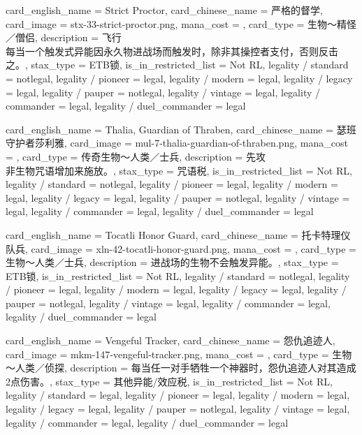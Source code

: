 \documentclass[lang = cn, color = black, 10pt]{AllThatStax}
\begin{document}
\card
{
	card_english_name = {Strict Proctor},
	card_chinese_name = {严格的督学},
	card_image = stx-33-strict-proctor.png,
	mana_cost = ,
	card_type = 生物～精怪／僧侣,
	description = {飞行\\
每当一个触发式异能因永久物进战场而触发时，除非其操控者支付，否则反击之。},
	stax_type = ETB锁,
	is_in_restricted_list = Not RL,
	legality / standard = notlegal,
	legality / pioneer = legal,
	legality / modern = legal,
	legality / legacy = legal,
	legality / pauper = notlegal,
	legality / vintage = legal,
	legality / commander = legal,
	legality / duel_commander = legal
}

\card
{
	card_english_name = {Thalia, Guardian of Thraben},
	card_chinese_name = {瑟班守护者莎利雅},
	card_image = mul-7-thalia-guardian-of-thraben.png,
	mana_cost = ,
	card_type = 传奇生物～人类／士兵,
	description = {先攻\\
非生物咒语增加来施放。},
	stax_type = 咒语税,
	is_in_restricted_list = Not RL,
	legality / standard = notlegal,
	legality / pioneer = legal,
	legality / modern = legal,
	legality / legacy = legal,
	legality / pauper = notlegal,
	legality / vintage = legal,
	legality / commander = legal,
	legality / duel_commander = legal
}

\card
{
	card_english_name = {Tocatli Honor Guard},
	card_chinese_name = {托卡特理仪队兵},
	card_image = xln-42-tocatli-honor-guard.png,
	mana_cost = ,
	card_type = 生物～人类／士兵,
	description = {进战场的生物不会触发异能。},
	stax_type = ETB锁,
	is_in_restricted_list = Not RL,
	legality / standard = notlegal,
	legality / pioneer = legal,
	legality / modern = legal,
	legality / legacy = legal,
	legality / pauper = notlegal,
	legality / vintage = legal,
	legality / commander = legal,
	legality / duel_commander = legal
}

\card
{
	card_english_name = {Vengeful Tracker},
	card_chinese_name = {怨仇追迹人},
	card_image = mkm-147-vengeful-tracker.png,
	mana_cost = ,
	card_type = 生物～人类／侦探,
	description = {每当任一对手牺牲一个神器时，怨仇追迹人对其造成2点伤害。},
	stax_type = 其他异能/效应税,
	is_in_restricted_list = Not RL,
	legality / standard = legal,
	legality / pioneer = legal,
	legality / modern = legal,
	legality / legacy = legal,
	legality / pauper = notlegal,
	legality / vintage = legal,
	legality / commander = legal,
	legality / duel_commander = legal
}
\end{document}
